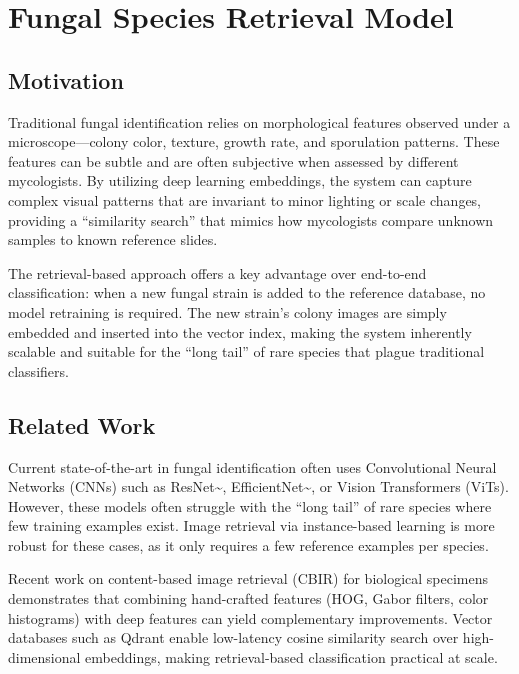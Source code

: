 \section{Fungal Species Retrieval Model}\label{chapter-2-fungal-species-retrieval-model}

\subsection{Motivation}\label{motivation}

Traditional fungal identification relies on morphological features observed under a microscope---colony color, texture, growth rate, and sporulation patterns. These features can be subtle and are often subjective when assessed by different mycologists. By utilizing deep learning embeddings, the system can capture complex visual patterns that are invariant to minor lighting or scale changes, providing a ``similarity search'' that mimics how mycologists compare unknown samples to known reference slides.

The retrieval-based approach offers a key advantage over end-to-end classification: when a new fungal strain is added to the reference database, no model retraining is required. The new strain's colony images are simply embedded and inserted into the vector index, making the system inherently scalable and suitable for the ``long tail'' of rare species that plague traditional classifiers.

\subsection{Related Work}\label{related-work}

Current state-of-the-art in fungal identification often uses Convolutional Neural Networks (CNNs) such as ResNet\textasciitilde{}\cite{he2016resnet}, EfficientNet\textasciitilde{}\cite{tan2019efficientnet}, or Vision Transformers (ViTs). However, these models often struggle with the ``long tail'' of rare species where few training examples exist. Image retrieval via instance-based learning is more robust for these cases, as it only requires a few reference examples per species.

Recent work on content-based image retrieval (CBIR) for biological specimens demonstrates that combining hand-crafted features (HOG, Gabor filters, color histograms) with deep features can yield complementary improvements. Vector databases such as Qdrant enable low-latency cosine similarity search over high-dimensional embeddings, making retrieval-based classification practical at scale.

